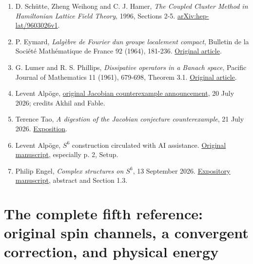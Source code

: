 \documentclass[11pt,a4paper]{article}
\providecommand{\tightlist}{\setlength{\itemsep}{0pt}\setlength{\parskip}{0pt}}
\let\originalsection\section
\renewcommand{\section}{\clearpage\originalsection}
\begin{document}
\begin{enumerate}
\def\labelenumi{\arabic{enumi}.}
\tightlist
\item
  D. Schütte, Zheng Weihong and C. J. Hamer, \emph{The Coupled Cluster
  Method in Hamiltonian Lattice Field Theory}, 1996, Sections 2-5.
  \href{https://arxiv.org/abs/hep-lat/9603026v1}{{a\allowbreak{}r\allowbreak{}X\allowbreak{}i\allowbreak{}v\allowbreak{}:\allowbreak{}h\allowbreak{}e\allowbreak{}p\allowbreak{}-\allowbreak{}l\allowbreak{}a\allowbreak{}t\allowbreak{}/\allowbreak{}9\allowbreak{}6\allowbreak{}0\allowbreak{}3\allowbreak{}0\allowbreak{}2\allowbreak{}6\allowbreak{}v\allowbreak{}1\allowbreak{}}}.
\item
  P. Eymard, \emph{L\textquotesingle algèbre de Fourier
  d\textquotesingle un groupe localement compact}, Bulletin de la
  Société Mathématique de France 92 (1964), 181-236.
  \href{https://www.numdam.org/item/BSMF_1964__92__181_0/}{Original
  article}.
\item
  G. Lumer and R. S. Phillips, \emph{Dissipative operators in a Banach
  space}, Pacific Journal of Mathematics 11 (1961), 679-698, Theorem
  3.1.
  \href{https://msp.org/pjm/1961/11-2/pjm-v11-n2-p19-s.pdf}{Original
  article}.
\item
  Levent Alpöge,
  \href{https://x.com/__alpoge__/status/2079028340955197566}{original
  Jacobian counterexample announcement}, 20 July 2026; credits Akhil and
  Fable.
\item
  Terence Tao, \emph{A digestion of the Jacobian conjecture
  counterexample}, 21 July 2026.
  \href{https://terrytao.wordpress.com/2026/07/21/a-digestion-of-the-jacobian-conjecture-counterexample/}{Exposition}.
\item
  Levent Alpöge, \(S^6\) construction circulated with AI assistance.
  \href{https://alpo.ge/s6.pdf}{Original manuscript}, especially p. 2,
  Setup.
\item
  Philip Engel, \emph{Complex structures on \(S^6\)}, 13 September 2026.
  \href{https://philip-engel.github.io/S6.pdf}{Expository manuscript},
  abstract and Section 1.3.
\end{enumerate}

\clearpage
\appendix

\section{The complete fifth reference: original spin channels, a
convergent correction, and physical
energy}\label{the-complete-fifth-reference-original-spin-channels-a-convergent-correction-and-physical-energy}
\end{document}
